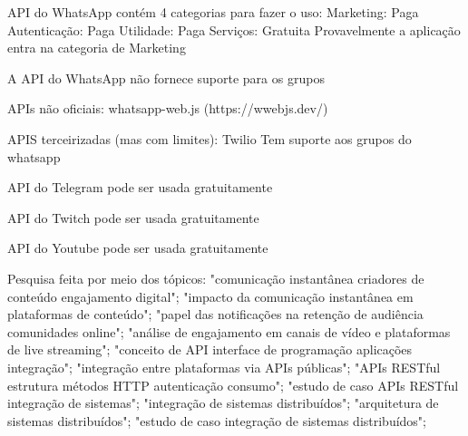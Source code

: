 
API do WhatsApp contém 4 categorias para fazer o uso:
    Marketing: Paga
    Autenticação: Paga
    Utilidade: Paga
    Serviços: Gratuita
Provavelmente a aplicação entra na categoria de Marketing

A API do WhatsApp não fornece suporte para os grupos

APIs não oficiais:
    whatsapp-web.js (https://wwebjs.dev/)
        
APIS terceirizadas (mas com limites):
    Twilio
        Tem suporte aos grupos do whatsapp



API do Telegram pode ser usada gratuitamente


API do Twitch pode ser usada gratuitamente


API do Youtube pode ser usada gratuitamente


Pesquisa feita por meio dos tópicos:
"comunicação instantânea criadores de conteúdo engajamento digital"; 
"impacto da comunicação instantânea em plataformas de conteúdo"; 
"papel das notificações na retenção de audiência comunidades online"; 
"análise de engajamento em canais de vídeo e plataformas de live streaming"; 
"conceito de API interface de programação aplicações integração"; 
"integração entre plataformas via APIs públicas"; 
"APIs RESTful estrutura métodos HTTP autenticação consumo"; 
"estudo de caso APIs RESTful integração de sistemas"; 
"integração de sistemas distribuídos"; 
"arquitetura de sistemas distribuídos"; 
"estudo de caso integração de sistemas distribuídos"; 
